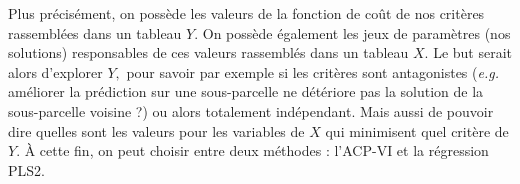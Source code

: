 Plus précisément, on possède les valeurs de la fonction de coût de nos critères rassemblées dans un tableau $Y$.
On possède également les jeux de paramètres (nos solutions) responsables de ces valeurs rassemblés dans un tableau $X$.
Le but serait alors d'explorer $Y,$ pour savoir par exemple si les critères sont antagonistes (\emph{e.g.} améliorer la prédiction sur une sous-parcelle ne détériore pas la solution de la sous-parcelle voisine ?) ou alors totalement indépendant.
Mais aussi de pouvoir dire quelles sont les valeurs pour les variables de $X$ qui minimisent quel critère de $Y$. 
À cette fin, on peut choisir entre deux méthodes : l'ACP-VI  et la régression PLS2.
